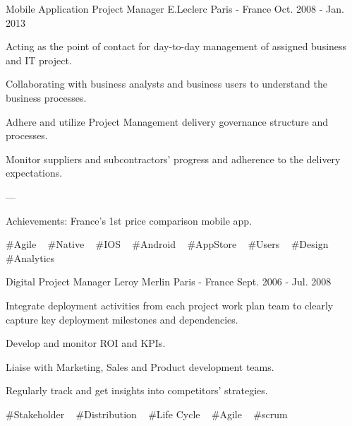 \begin{cventries}
  \cventry
    {Mobile Application Project Manager} %
    {E.Leclerc} %
    {Paris - France} %
    {Oct. 2008 - Jan. 2013} %
    {
      \begin{cvitems} %
        \item {Acting as the point of contact for day-to-day management of assigned business and IT project.}
        \item {Collaborating with business analysts and business users to understand the business processes.}
        \item {Adhere and utilize Project Management delivery governance structure and processes.}
        \item {Monitor suppliers and subcontractors' progress and adherence to the delivery expectations.}
        \item {---}
        \item {Achievements: France's 1st price comparison mobile app.}
      \end{cvitems}
    }
    {
      \#Agile ~
      \#Native ~
      \#IOS ~
      \#Android ~
      \#AppStore ~
      \#Users ~
      \#Design ~
      \#Analytics ~
    }

  \cventry
    {Digital Project Manager} %
    {Leroy Merlin} %
    {Paris - France} %
    {Sept. 2006 - Jul. 2008} %
    {
      \begin{cvitems} %
        \item {Integrate deployment activities from each project work plan team to clearly capture key deployment milestones and dependencies.}
        \item {Develop and monitor ROI and KPIs.}
        \item {Liaise with Marketing, Sales and Product development teams.}
        \item {Regularly track and get insights into competitors' strategies.}
      \end{cvitems}
    }
    {
      \#Stakeholder ~
      \#Distribution ~
      \#Life Cycle ~
      \#Agile ~
      \#scrum ~
    }

\end{cventries}
